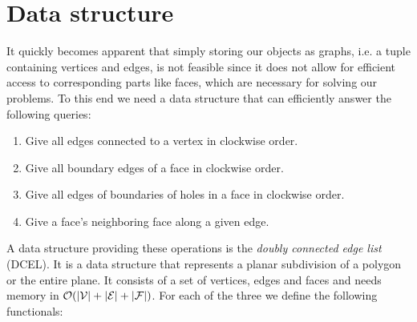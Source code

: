 \section{Data structure}
    It quickly becomes apparent that simply storing our objects as graphs, i.e. a tuple containing vertices and edges, is not feasible since it does not allow for efficient access to corresponding parts like faces, which are necessary for solving our problems. To this end we need a data structure that can efficiently answer the following queries:
    \begin{enumerate}[label=(\roman*), itemsep=-3pt]
        \item Give all edges connected to a vertex in clockwise order.
        \item Give all boundary edges of a face in clockwise order.
        \item Give all edges of boundaries of holes in a face in clockwise order.
        \item Give a face's neighboring face along a given edge.
    \end{enumerate}
    A data structure providing these operations is the \emph{doubly connected edge list} (DCEL). It is a data structure that represents a planar subdivision of a polygon or the entire plane. It consists of a set of vertices, edges and faces and needs memory in $\mathcal{O}(\vert \mathcal{V} \vert + \vert \mathcal{E} \vert + \vert \mathcal{F} \vert)$. For each of the three we define the following functionals:

